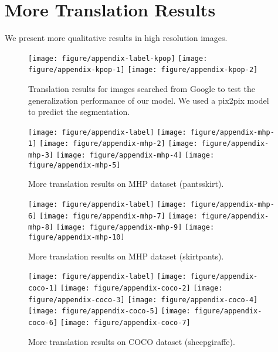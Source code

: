 \documentclass{article} \usepackage{iclr2019_conference,times}
\begin{document}
\section{More Translation Results}
\label{sec:more-results}

We present more qualitative results in high resolution images.

\begin{figure}[H]
	\centering
    \texttt{[image: figure/appendix-label-kpop]}
	\texttt{[image: figure/appendix-kpop-1]}
	\texttt{[image: figure/appendix-kpop-2]}
	\caption{
	Translation results for images searched from Google to test the generalization performance of our model.
	We used a pix2pix \citep{isola2017image} model to predict the segmentation.
	} \label{fig:kpop}
\end{figure}

\begin{figure}[H]
	\centering
	\texttt{[image: figure/appendix-label]}
	\texttt{[image: figure/appendix-mhp-1]}
	\texttt{[image: figure/appendix-mhp-2]}
	\texttt{[image: figure/appendix-mhp-3]}
	\texttt{[image: figure/appendix-mhp-4]}
	\texttt{[image: figure/appendix-mhp-5]}
	\caption{
	More translation results on MHP dataset (pantsskirt).
	} \label{fig:more-mhp-1}
\end{figure}

\begin{figure}[H]
	\centering
	\texttt{[image: figure/appendix-label]}
	\texttt{[image: figure/appendix-mhp-6]}
	\texttt{[image: figure/appendix-mhp-7]}
	\texttt{[image: figure/appendix-mhp-8]}
	\texttt{[image: figure/appendix-mhp-9]}
	\texttt{[image: figure/appendix-mhp-10]}
	\caption{
	More translation results on MHP dataset (skirtpants).
	} \label{fig:more-mhp-2}
\end{figure}

\begin{figure}[H]
	\centering
	\texttt{[image: figure/appendix-label]}
	\texttt{[image: figure/appendix-coco-1]}
    \texttt{[image: figure/appendix-coco-2]}
    \texttt{[image: figure/appendix-coco-3]}
    \texttt{[image: figure/appendix-coco-4]}
    \texttt{[image: figure/appendix-coco-5]}
    \texttt{[image: figure/appendix-coco-6]}
    \texttt{[image: figure/appendix-coco-7]}
	\caption{
	More translation results on COCO dataset (sheepgiraffe).
	} \label{fig:more-coco-1}
\end{figure}
\end{document}

